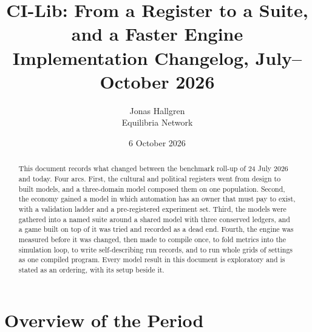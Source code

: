 \documentclass[11pt]{article}
\title{CI-Lib: From a Register to a Suite, and a Faster Engine\\
\large Implementation Changelog, July--October 2026}
\author{Jonas Hallgren\\Equilibria Network}
\date{6 October 2026}
\begin{document}
\maketitle

\begin{abstract}
This document records what changed between the benchmark roll-up of 24 July 2026 and
today. Four arcs. First, the cultural and political registers went from design to
built models, and a three-domain model composed them on one population. Second, the
economy gained a model in which automation has an owner that must pay to exist, with
a validation ladder and a pre-registered experiment set. Third, the models were
gathered into a named suite around a shared model with three conserved ledgers, and a
game built on top of it was tried and recorded as a dead end. Fourth, the engine was
measured before it was changed, then made to compile once, to fold metrics into the
simulation loop, to write self-describing run records, and to run whole grids of
settings as one compiled program. Every model result in this document is exploratory
and is stated as an ordering, with its setup beside it.
\end{abstract}

\tableofcontents
\newpage

\section{Overview of the Period}
\end{document}
